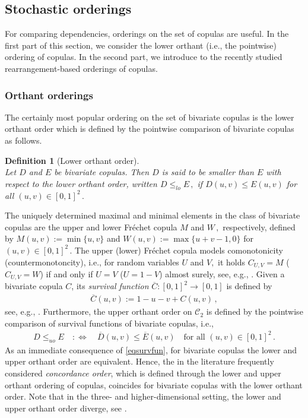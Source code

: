 \documentclass{article}
\newtheorem{definition}[theorem]{Definition}
\newcommand{\cC}{\mathcal{C}}
\begin{document}
\subsection{Stochastic orderings}\label{secstoo}

For comparing dependencies, orderings on the set of copulas are useful.
In the first part of this section, we consider the lower orthant (i.e., the pointwise) ordering of copulas.
In the second part, we introduce to the recently studied rearrangement-based orderings of copulas.


\subsubsection{Orthant orderings}

The certainly most popular ordering on the set of bivariate copulas is the lower orthant order which is defined by the pointwise comparison of bivariate copulas as follows.

\begin{definition}[Lower orthant order]\label{defi:lower_orthant_order}~\\
    Let \(D\) and \(E\) be bivariate copulas.
    Then \(D\) is said to be smaller than \(E\) with respect to the \emph{lower orthant order}, written \(D\leq_{lo} E\,,\) if \(D(u,v)\leq E(u,v)\) for all \((u,v)\in [0,1]^2\,.\)
\end{definition}

The uniquely determined maximal and minimal elements in the class of bivariate copulas are the upper and lower Fr\'{e}chet copula \(M\) and \(W\,,\) respectively, defined by \(M(u,v):=\min\{u,v\}\) and \(W(u,v):=\max\{u+v-1,0\}\) for \((u,v)\in [0,1]^2\,.\)
The upper (lower) Fr\'{e}chet copula models comonotonicity (countermonotoncity), i.e., for random variables \(U\) and \(V,\) it holds \(C_{U,V}=M\) (\(C_{U,V}=W\)) if and only if \(U=V\) (\(U=1-V\)) almost surely, see, e.g., \cite[Examples 1.3.3 and 1.3.5]{Durante-2016}.
Given a bivariate copula $C$, its \emph{survival function} \(\overline{C}\colon [0,1]^2\to [0,1]\) is defined by
\begin{align}\label{eqsurvfun}
    \overline{C}(u,v):= 1 -u-v+C(u,v)\,,
\end{align}
see, e.g., \cite{Durante-2016}.
Furthermore, the upper orthant order on \(\cC_2\) is defined by the pointwise comparison of survival functions of bivariate copulas, i.e.,
\begin{align*}
    D \leq_{uo} E \quad \colon \Longleftrightarrow \quad \overline{D}(u,v) \leq \overline{E}(u,v) \quad \text{for all } (u,v)\in [0,1]^2\,.
\end{align*}
As an immediate consequence of \eqref{eqsurvfun}, for bivariate copulas the lower and upper orthant order are equivalent.
Hence, the in the literature frequently considered \emph{concordance order}, which is defined through the lower and upper orthant ordering of copulas, coincides for bivariate copulas with the lower orthant order. Note that in the three- and higher-dimensional setting, the lower and upper orthant order diverge, see \cite{Mueller-Stoyan-2002}.
\end{document}
